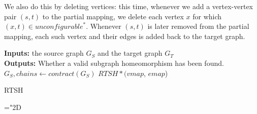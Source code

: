 We also do this by deleting vertices: this time, whenever we add a vertex-vertex pair $(s, t)$ to the partial mapping, we delete each vertex $x$ for which $(x, t) \in \mathit{unconfigurable}^*$. Whenever $(s, t)$ is later removed from the partial mapping, each such vertex and their edges is added back to the target graph.

\newenvironment{Algorithm}[2][tbh]%
{\begin{myalgo}[#1]
\centering
\begin{minipage}{#2}
\begin{algorithm}[H]}%
{\end{algorithm}
\end{minipage}
\end{myalgo}}


\begin{Algorithm}{18cm}
\DontPrintSemicolon
\SetAlgoLined
\LinesNumbered
\textbf{Inputs: } the source graph $G_S$ and the target graph $G_T$\\
\textbf{Outputs: } Whether a valid subgraph homeomorphism has been found.\\
 {
	$G_S, \mathit{chains} \longleftarrow \mathit{contract}(G_S)$ 
}
 \Return $\mathit{RTSH*}(\mathit{vmap}$, $\mathit{emap}$)\;
 \caption{RTSH}
 \label{algorithm:ndSHD2-prune}
\end{Algorithm}

\mathchardef\mhyphen="2D %

